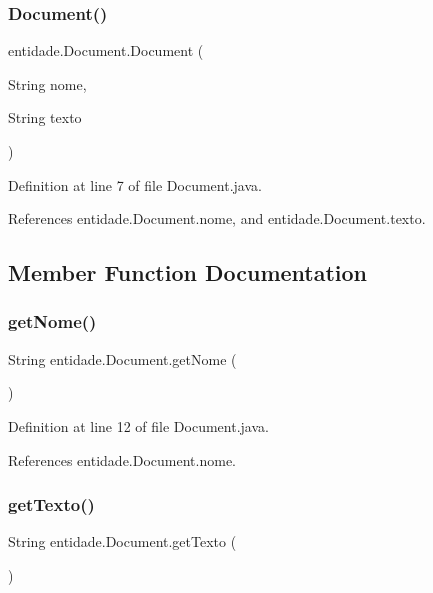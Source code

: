 \subsubsection{\texorpdfstring{Document()}{Document()}}
{\footnotesize\ttfamily entidade.\+Document.\+Document (\begin{DoxyParamCaption}\item[{String}]{nome,  }\item[{String}]{texto }\end{DoxyParamCaption})}



Definition at line 7 of file Document.\+java.



References entidade.\+Document.\+nome, and entidade.\+Document.\+texto.



\subsection{Member Function Documentation}
\hypertarget{classentidade_1_1Document_aeeee0c94c00c921c2cc9b22bf2337f6c}{}\label{classentidade_1_1Document_aeeee0c94c00c921c2cc9b22bf2337f6c} 
\subsubsection{\texorpdfstring{get\+Nome()}{getNome()}}
{\footnotesize\ttfamily String entidade.\+Document.\+get\+Nome (\begin{DoxyParamCaption}{ }\end{DoxyParamCaption})}



Definition at line 12 of file Document.\+java.



References entidade.\+Document.\+nome.

\hypertarget{classentidade_1_1Document_abbdb123ed0ae443399b81060a7be9979}{}\label{classentidade_1_1Document_abbdb123ed0ae443399b81060a7be9979} 
\subsubsection{\texorpdfstring{get\+Texto()}{getTexto()}}
{\footnotesize\ttfamily String entidade.\+Document.\+get\+Texto (\begin{DoxyParamCaption}{ }\end{DoxyParamCaption})}



